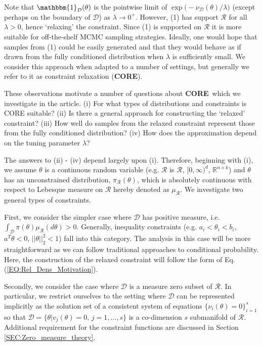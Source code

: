 \documentclass[10pt,fleqn]{article}
\newcommand{\core}{\textbf{CORE}}
\DeclareMathOperator{\1}{\mathbbm{1}}
\begin{document}
Note that $\mathbbm{1}_\mathcal{D}(\theta)$ is the pointwise limit of $\exp\big(- \nu_\mathcal{D}(\theta)/\lambda)$ (except perhaps on the boundary of $\mathcal{D}$) as $\lambda \to 0^+.$ However, (1) has support $\mathcal{R}$ for all $\lambda > 0$, hence `relaxing' the constraint.   Since (1) is supported on $\mathcal{R}$ it is more suitable for off-the-shelf MCMC sampling strategies.   Ideally, one would hope that samples from (1) could be easily generated and that they would behave as if drawn from the fully conditioned distribution when $\lambda$ is sufficiently small. We consider this approach when adapted to a number of settings, but generally we refer to it as constraint relaxation (\core).

These observations motivate a number of questions about \core\, which we investigate in the article.  (i) For what types of distributions and constraints is CORE suitable? (ii) Is there a general approach for constructing the `relaxed' constraint? (iii) How well do samples from the relaxed constraint represent those from the fully conditioned distribution? (iv) How does the approximation depend on the tuning parameter $\lambda$? 

The answers to (ii) - (iv) depend largely upon (i).  Therefore, beginning with (i), we assume $\theta$ is a continuous random variable (e.g. $\mathcal{R}$ is $\mathcal{R}$, $[0,\infty)^d$, $\mathbb{R}^{n\times k}$) and $\theta$ has an unconstrained distribution, $\pi_\mathcal{R}(\theta)$,  which is absolutely continuous with respect to Lebesque measure on $\mathcal{R}$ hereby denoted as $\mu_\mathcal{R}$.  We investigate two general types of constraints. 



First, we consider the simpler case where $\mathcal{D}$ has positive measure, i.e. $\int_\mathcal{D} \pi(\theta) \mu_\mathcal{R}(d\theta) >0.$ Generally, inequality constraints (e.g. $a_i < \theta_i < b_i$, $a^T\theta < 0$, $||\theta||_2^2 < 1$) fall into this category. The analysis in this case will be more straightforward as we can follow traditional approaches to conditional probability. Here, the construction of the relaxed constraint will follow the form of Eq. (\ref{EQ:Rel_Dens_Motivation}).

Secondly, we consider the case where $\mathcal{D}$ is a measure zero subset of $\mathcal{R}$. In particular, we restrict ourselves to the setting where $\mathcal{D}$ can be represented implicitly as the solution set of a consistent system of equations $\{\nu_i(\theta) = 0\}_{i=1}^s$ so that $\mathcal{D} =\{\theta | v_j(\theta) =0, \, j = 1, \dots,s\}$ is a co-dimension $s$ submanifold of $\mathcal{R}$.  Additional requirement for the constraint functions are discussed in Section \ref{SEC:Zero_measure_theory}. 
\end{document}
